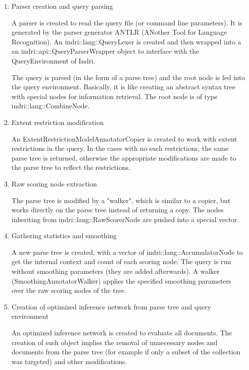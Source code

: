 \documentclass{article} %
\begin{document}
\begin{enumerate}

	\item Parser creation and query parsing
	
A parser is created to read the query file (or command line parameters). It is generated by the parser generator ANTLR (ANother Tool for Language Recognition). An indri::lang::QueryLexer is created and then wrapped into a an indri::api::QueryParserWrapper object to interface with the QueryEnvironment of Indri.\newline

The query is parsed (in the form of a parse tree) and the root node is fed into the query environment. Basically, it is like creating an abstract syntax tree with special nodes for information retrieval. The root node is of type indri::lang::CombineNode.


	\item Extent restriction modification

An ExtentRestrictionModelAnnotatorCopier is created to work with extent restrictions in the query. In the cases with no such restrictions, the same parse tree is returned, otherwise the appropriate modifications are made to the parse tree to reflect the restrictions.

	\item Raw scoring node extraction

The parse tree is modified by a "walker", which is similar to a copier, but works directly on the parse tree instead of returning a copy. The nodes inheriting from indri::lang::RawScorerNode are pushed into a special vector.

	\item Gathering statistics and smoothing

A new parse tree is created, with a vector of indri::lang::AccumulatorNode to get the internal context and count of each scoring node. The query is run without smoothing parameters (they are added afterwards). A walker (SmoothingAnnotatorWalker) applies the specified smoothing parameters over the raw scoring nodes of the tree.


	\item Creation of optimized inference network from parse tree and query environment

An optimized inference network is created to evaluate all documents. The creation of such object implies the removal of unnecessary nodes and documents from the parse tree (for example if only a subset of the collection was targeted) and other modifications.



\end{enumerate}
\end{document}
